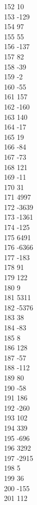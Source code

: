 { 152	10 \\
 153	-129 \\
 154	97 \\
 155	55 \\
 156	-137 \\
 157	82 \\
 158	-39 \\
 159	-2 \\
 160	-55 \\
 161	157 \\
 162	-160 \\
 163	140 \\
 164	-17 \\
 165	19 \\
 166	-84 \\
 167	-73 \\
 168	121 \\
 169	-11 \\
 170	31 \\
 171	4997 \\
 172	-3639 \\
 173	-1361 \\
 174	-125 \\
 175	6491 \\
 176	-6366 \\
 177	-183 \\
 178	91 \\
 179	122 \\
 180	9 \\
 181	5311 \\
 182	-5376 \\
 183	38 \\
 184	-83 \\
 185	8 \\
 186	128 \\
 187	-57 \\
 188	-112 \\
 189	80 \\
 190	-58 \\
 191	186 \\
 192	-260 \\
 193	102 \\
 194	339 \\
 195	-696 \\
 196	3292 \\
 197	-2915 \\
 198	5 \\
 199	36 \\
 200	-155 \\
 201	112 \\
}
